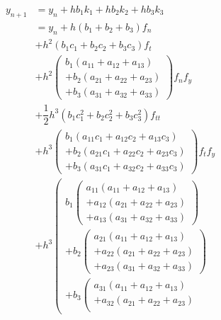 \documentclass[a4paper,oneside]{book}
\numberwithin{equation}{chapter}
\begin{document}
\begin{align}
{{y_{n + 1}}} &= {{y_n}} + h{b_1}{k_1} + h{b_2}{k_2} + h{b_3}{k_3}\\
 &= {{y_n}} + h\left( {{b_1} + {b_2} + {b_3}} \right){f_n}\\
& + {h^2}\left( {{b_1}{c_1} + {b_2}{c_2} + {b_3}{c_3}} \right){f_t}\\
& + {h^2}\left( \begin{array}{l}
{b_1}\left( {{a_{11}} + {a_{12}} + {a_{13}}} \right)\\
 + {b_2}\left( {{a_{21}} + {a_{22}} + {a_{23}}} \right)\\
 + {b_3}\left( {{a_{31}} + {a_{32}} + {a_{33}}} \right)
\end{array} \right){f_n}{f_y}\\
 &+ \dfrac{1}{2}{h^3}\left( {{b_1}c_1^2 + {b_2}c_2^2 + {b_3}c_3^2} \right){f_{tt}}\\
 &+ {h^3}\left( \begin{array}{l}
{b_1}\left( {{a_{11}}{c_1} + {a_{12}}{c_2} + {a_{13}}{c_3}} \right)\\
 + {b_2}\left( {{a_{21}}{c_1} + {a_{22}}{c_2} + {a_{23}}{c_3}} \right)\\
 + {b_3}\left( {{a_{31}}{c_1} + {a_{32}}{c_2} + {a_{33}}{c_3}} \right)
\end{array} \right){f_t}{f_y}\\
& + {h^3}\left( \begin{array}{l}
{b_1}\left( \begin{array}{l}
{a_{11}}\left( {{a_{11}} + {a_{12}} + {a_{13}}} \right)\\
 + {a_{12}}\left( {{a_{21}} + {a_{22}} + {a_{23}}} \right)\\
 + {a_{13}}\left( {{a_{31}} + {a_{32}} + {a_{33}}} \right)
\end{array} \right)\\
 + {b_2}\left( \begin{array}{l}
{a_{21}}\left( {{a_{11}} + {a_{12}} + {a_{13}}} \right)\\
 + {a_{22}}\left( {{a_{21}} + {a_{22}} + {a_{23}}} \right)\\
 + {a_{23}}\left( {{a_{31}} + {a_{32}} + {a_{33}}} \right)
\end{array} \right)\\
 + {b_3}\left( \begin{array}{l}
{a_{31}}\left( {{a_{11}} + {a_{12}} + {a_{13}}} \right)\\
 + {a_{32}}\left( {{a_{21}} + {a_{22}} + {a_{23}}} \right)\\

\end{array}
\end{array}
\end{align}
\end{document}
